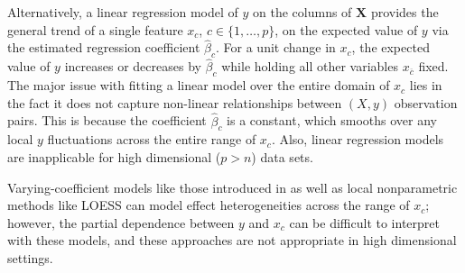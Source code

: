 \documentclass[12pt]{article}
\newcommand{\xnc}{$x_{\overline{c}}$}
\begin{document}
Alternatively, a linear regression model of $y$ on the columns of $\mathbf{X}$ provides the general trend of a single feature $x_c$, $c \in \{1, \ldots, p\}$, on the expected value of $y$ via the estimated regression coefficient $\widehat{\beta}_c$.  For a unit change in $x_c$, the expected value of $y$ increases or decreases by $\widehat{\beta}_c$ while holding all other variables \xnc{}  fixed.  The major issue with fitting a linear model over the entire domain of $x_c$ lies in the fact it does not capture non-linear relationships between $(X,y)$ observation pairs. This is because the coefficient $\widehat{\beta}_c$ is a constant, which smooths over any local $y$ fluctuations across the entire range of $x_c$.  Also, linear regression models are inapplicable for high dimensional ($p > n$) data sets.

Varying-coefficient models like those introduced in \citet{fan2008statistical} as well as local nonparametric methods like LOESS \citep{cleveland1979robust, cleveland1981lowess, cleveland1988locally} can model effect heterogeneities across the range of $x_c$; however, the partial dependence between $y$ and $x_c$ can be difficult to interpret with these models, and these approaches are not appropriate in high dimensional settings. 
\end{document}
